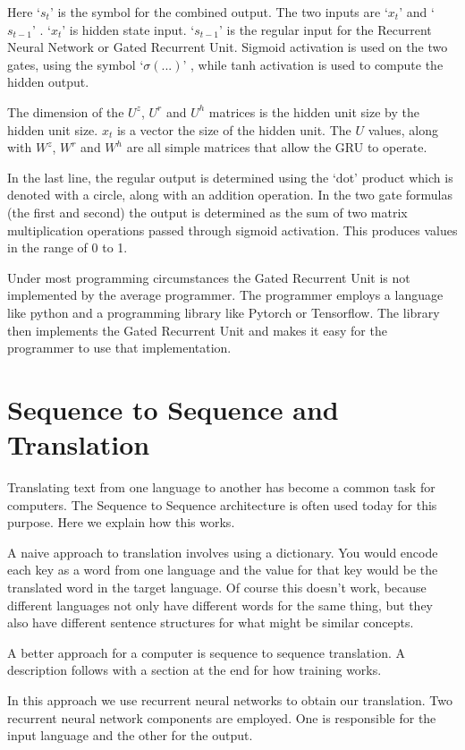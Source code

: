 Here `$ s_t $' is the symbol for the combined output. The two inputs are `$ x_t $' and `$ s_{t-1} $' . `$ x_t $' is hidden state input. `$ s_{t-1} $' is the regular input for the Recurrent Neural Network or Gated Recurrent Unit. Sigmoid activation is used on the two gates, using the symbol `$ \sigma(...) $' , while tanh activation is used to compute the hidden output. 

The dimension of the $U^z$, $U^r$ and $U^h$ matrices is the hidden unit size by the hidden unit size. $ x_t $ is a vector the size of the hidden unit. The $U$ values, along with $ W^z $, $ W^r $ and $ W^h $  are all simple matrices that allow the GRU to operate.

In the last line, the regular output is determined using the `dot' product which is denoted with a circle, along with an addition operation. In the two gate formulas (the first and second) the output is determined as the sum of two matrix multiplication operations passed through sigmoid activation. This produces values in the range of 0 to 1.

Under most programming circumstances the Gated Recurrent Unit is not implemented by the average programmer. The programmer employs a language like python and a programming library like Pytorch or Tensorflow. The library then implements the Gated Recurrent Unit and makes it easy for the programmer to use that implementation.

\section{Sequence to Sequence and Translation}

Translating text from one language to another has become a common task for computers. The Sequence to Sequence architecture is often used today for this purpose. Here we explain how this works.

A naive approach to translation involves using a dictionary. You would encode each key as a word from one language and the value for that key would be the translated word in the target language. Of course this doesn't work, because different languages not only have different words for the same thing, but they also have different sentence structures for what might be similar concepts.

A better approach for a computer is sequence to sequence translation. A description follows with a section at the end for how training works.

In this approach we use recurrent neural networks to obtain our translation. Two recurrent neural network components are employed. One is responsible for the input language and the other for the output. 


